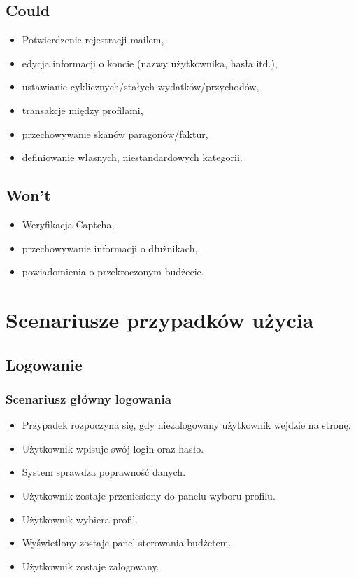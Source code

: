 \documentclass[12pt,a4paper,oneside]{article}
\begin{document}
\subsection{Could}
\begin{itemize}
    \item Potwierdzenie rejestracji mailem,
    \item edycja informacji o koncie (nazwy użytkownika, hasła itd.),
    \item ustawianie cyklicznych/stałych wydatków/przychodów,
    \item transakcje między profilami,
    \item przechowywanie skanów paragonów/faktur,
    \item definiowanie własnych, niestandardowych kategorii.
\end{itemize}

\subsection{Won't}
\begin{itemize}
    \item Weryfikacja Captcha,
    \item przechowywanie informacji o dłużnikach,
    \item powiadomienia o przekroczonym budżecie.
\end{itemize}

\section{Scenariusze przypadków użycia}
\subsection{Logowanie}
\subsubsection{Scenariusz główny logowania}
\begin{itemize}
    \item Przypadek rozpoczyna się, gdy niezalogowany użytkownik wejdzie
          na stronę.
    \item Użytkownik wpisuje swój login oraz hasło.
    \item System sprawdza poprawność danych.
    \item Użytkownik zostaje przeniesiony do panelu wyboru profilu.
    \item Użytkownik wybiera profil.
    \item Wyświetlony zostaje panel sterowania budżetem.
    \item Użytkownik zostaje zalogowany.
\end{itemize}
\end{document}
